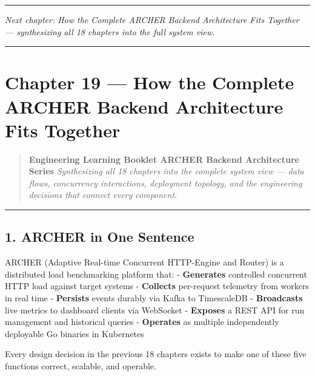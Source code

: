 \documentclass[
]{article}
\begin{document}
\begin{center}\rule{0.5\linewidth}{0.5pt}\end{center}

\emph{Next chapter: How the Complete ARCHER Backend Architecture Fits
Together --- synthesizing all 18 chapters into the full system view.}

\begin{center}\rule{0.5\linewidth}{0.5pt}\end{center}

\hypertarget{chapter-19-how-the-complete-archer-backend-architecture-fits-together}{%
\section{Chapter 19 --- How the Complete ARCHER Backend Architecture
Fits
Together}\label{chapter-19-how-the-complete-archer-backend-architecture-fits-together}}

\begin{quote}
\textbf{Engineering Learning Booklet \textbar{} ARCHER Backend
Architecture Series} \emph{Synthesizing all 18 chapters into the
complete system view --- data flows, concurrency interactions,
deployment topology, and the engineering decisions that connect every
component.}
\end{quote}

\begin{center}\rule{0.5\linewidth}{0.5pt}\end{center}

\hypertarget{archer-in-one-sentence}{%
\subsection{1. ARCHER in One Sentence}\label{archer-in-one-sentence}}

ARCHER (Adaptive Real-time Concurrent HTTP-Engine and Router) is a
distributed load benchmarking platform that: - \textbf{Generates}
controlled concurrent HTTP load against target systems -
\textbf{Collects} per-request telemetry from workers in real time -
\textbf{Persists} events durably via Kafka to TimescaleDB -
\textbf{Broadcasts} live metrics to dashboard clients via WebSocket -
\textbf{Exposes} a REST API for run management and historical queries -
\textbf{Operates} as multiple independently deployable Go binaries in
Kubernetes

Every design decision in the previous 18 chapters exists to make one of
these five functions correct, scalable, and operable.
\end{document}
